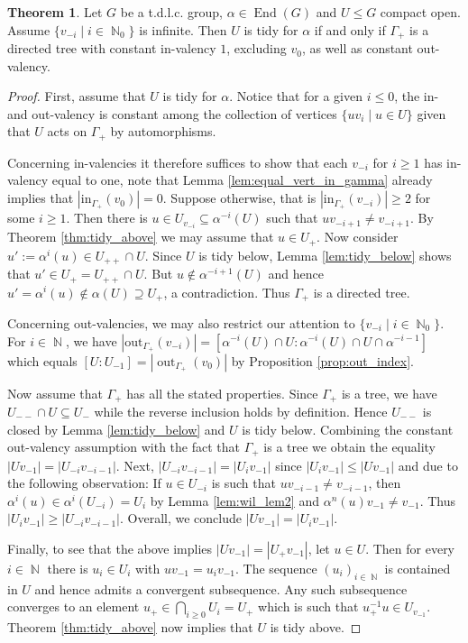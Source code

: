 \documentclass{article}
\DeclareMathOperator\End{End}
\DeclareMathOperator\out{out}
\DeclareMathOperator\bbN{\mathbb{N}}
\theoremstyle{definition}
\newtheorem{theorem}{Theorem}[section]
\begin{document}
\begin{theorem}\label{thm:tidy_tree}
Let $G$ be a t.d.l.c. group, $\alpha\in\End(G)$ and $U\le G$ compact open. Assume $\{v_{-i}\mid i\in\bbN_{0}\}$ is infinite. Then $U$ is tidy for $\alpha$ if and only if $\Gamma_{+}$ is a directed tree with constant in-valency $1$, excluding $v_{0}$, as well as constant out-valency.
\end{theorem}
\begin{proof}
First, assume that $U$ is tidy for $\alpha$. Notice that for a given $i\le 0$, the in- and out-valency is constant among the collection of vertices $\{uv_{i}\mid u\in U\}$ given that $U$ acts on $\Gamma_{+}$ by automorphisms.

Concerning in-valencies it therefore suffices to show that each $v_{-i}$ for $i\ge 1$ has in-valency equal to one, note that Lemma \ref{lem:equal_vert_in_gamma} already implies that $|\mathrm{in}_{\Gamma_{+}}(v_0)| = 0$. Suppose otherwise, that is $|\mathrm{in}_{\Gamma_{+}}(v_{-i})|\ge 2$ for some $i\ge 1$. Then there is $u\in U_{v_{-i}}\subseteq\alpha^{-i}(U)$ such that $u v_{-i+1}\neq v_{-i+1}$. By Theorem \ref{thm:tidy_above} we may assume that $u\in U_{+}$. Now consider $u':=\alpha^{i}(u)\in U_{++}\cap U$. Since $U$ is tidy below, Lemma \ref{lem:tidy_below} shows that $u'\in U_{+}=U_{++}\cap U$. But $u\not\in\alpha^{-i+1}(U)$ and hence $u'=\alpha^{i}(u)\not\in\alpha(U)\supseteq U_{+}$, a contradiction. Thus $\Gamma_{+}$ is a directed tree.

Concerning out-valencies, we may also restrict our attention to $\{v_{-i}\mid i\in\bbN_{0}\}$. For $i\in\bbN$, we have $|\mathrm{out}_{\Gamma_{+}}(v_{-i})|=[\alpha^{-i}(U)\cap U:\alpha^{-i}(U)\cap U\cap\alpha^{-i-1}]$ which equals $[U:U_{-1}]=|\out_{\Gamma_{+}}(v_{0})|$ by Proposition \ref{prop:out_index}.

\vspace{0.2cm}
Now assume that $\Gamma_{+}$ has all the stated properties. Since $\Gamma_{+}$ is a tree, we have $U_{--}\cap U\subseteq U_{-}$ while the reverse inclusion holds by definition. Hence $U_{--}$ is closed by Lemma \ref{lem:tidy_below} and $U$ is tidy below. Combining the constant out-valency assumption with the fact that $\Gamma_{+}$ is a tree we obtain the equality $|Uv_{-1}|=|U_{-i}v_{-i-1}|$. Next, $|U_{-i}v_{-i-1}|=|U_{i}v_{-1}|$ since $|U_{i}v_{-1}|\le|Uv_{-1}|$ and due to the following observation: If $u\in U_{-i}$ is such that $uv_{-i-1}\neq v_{-i-1}$, then $\alpha^{i}(u)\in\alpha^{i}(U_{-i})=U_{i}$ by Lemma \ref{lem:wil_lem2} and $\alpha^{n}(u)v_{-1}\neq v_{-1}$. Thus $|U_{i}v_{-1}|\ge|U_{-i}v_{-i-1}|$. Overall, we conclude $|Uv_{-1}|=|U_{i}v_{-1}|$.

Finally, to see that the above implies $|Uv_{-1}|=|U_{+}v_{-1}|$, let $u\in U$. Then for every $i\in\bbN$ there is $u_{i}\in U_{i}$ with $uv_{-1}=u_{i}v_{-1}$. The sequence $(u_{i})_{i\in\bbN}$ is contained in $U$ and hence admits a convergent subsequence. Any such subsequence converges to an element $u_{+}\in\bigcap_{i\ge 0}U_{i}=U_{+}$ which is such that $u_{+}^{-1}u\in U_{v_{-1}}$. Theorem \ref{thm:tidy_above} now implies that $U$ is tidy above.
\end{proof}
\end{document}
